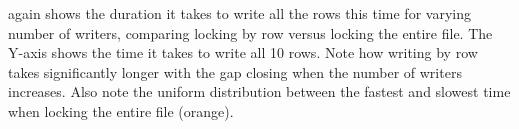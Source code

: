  again shows the duration it takes to write all the rows this time for varying number of writers, comparing locking by row versus locking the entire file. The Y-axis shows the time it takes to write all 10 rows. Note how writing by row takes significantly longer with the gap closing when the number of writers increases. Also note the uniform distribution between the fastest and slowest time when locking the entire file (orange).
%

\clearpage

